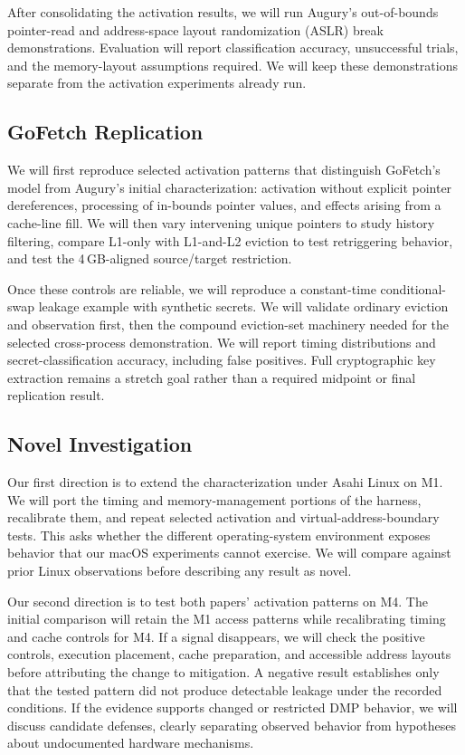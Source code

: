 After consolidating the activation results, we will run Augury's out-of-bounds pointer-read and address-space layout randomization (ASLR) break demonstrations. Evaluation will report classification accuracy, unsuccessful trials, and the memory-layout assumptions required. We will keep these demonstrations separate from the activation experiments already run.

\subsection{GoFetch Replication}
We will first reproduce selected activation patterns that distinguish GoFetch's model from Augury's initial characterization: activation without explicit pointer dereferences, processing of in-bounds pointer values, and effects arising from a cache-line fill. We will then vary intervening unique pointers to study history filtering, compare L1-only with L1-and-L2 eviction to test retriggering behavior, and test the 4\,GB-aligned source/target restriction.

Once these controls are reliable, we will reproduce a constant-time conditional-swap leakage example with synthetic secrets. We will validate ordinary eviction and observation first, then the compound eviction-set machinery needed for the selected cross-process demonstration. We will report timing distributions and secret-classification accuracy, including false positives. Full cryptographic key extraction remains a stretch goal rather than a required midpoint or final replication result.

\subsection{Novel Investigation}
Our first direction is to extend the characterization under Asahi Linux on M1. We will port the timing and memory-management portions of the harness, recalibrate them, and repeat selected activation and virtual-address-boundary tests. This asks whether the different operating-system environment exposes behavior that our macOS experiments cannot exercise. We will compare against prior Linux observations before describing any result as novel.

Our second direction is to test both papers' activation patterns on M4. The initial comparison will retain the M1 access patterns while recalibrating timing and cache controls for M4. If a signal disappears, we will check the positive controls, execution placement, cache preparation, and accessible address layouts before attributing the change to mitigation. A negative result establishes only that the tested pattern did not produce detectable leakage under the recorded conditions. If the evidence supports changed or restricted DMP behavior, we will discuss candidate defenses, clearly separating observed behavior from hypotheses about undocumented hardware mechanisms.
